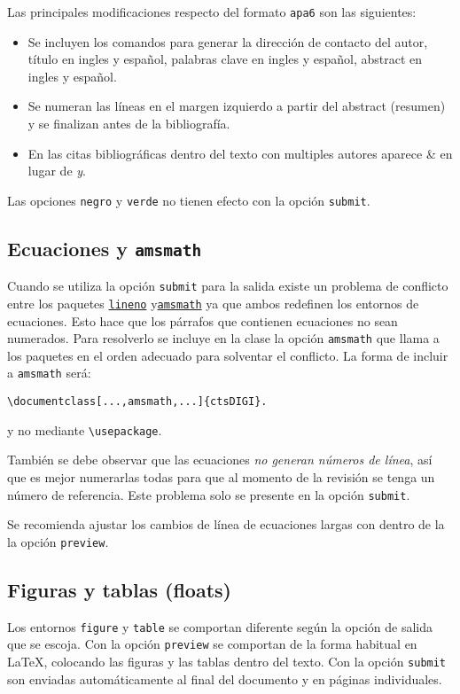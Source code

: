 \documentclass{article}
\begin{document}
Las principales modificaciones respecto del formato \texttt{apa6} son las siguientes:
\begin{itemize}
\item Se incluyen los comandos para generar la dirección de contacto del autor, título en ingles y español, palabras clave en ingles y español, abstract en ingles y español.
\item Se numeran las líneas en el margen izquierdo a partir del abstract (resumen) y se finalizan antes de la bibliografía.
\item En las citas bibliográficas dentro del texto con multiples autores aparece \& en lugar de \emph{y}.
\end{itemize}
Las opciones {\tt negro} y {\tt verde} no tienen efecto con la opción {\tt submit}.

\subsection{Ecuaciones y \texttt{amsmath}}
Cuando se utiliza la opción \texttt{submit} para la salida existe un problema de conflicto entre los paquetes \href{https://www.ctan.org/pkg/lineno}{\texttt{lineno}} y\href{https://www.ctan.org/pkg/amsmath}{\texttt{amsmath}} ya que ambos redefinen los entornos de ecuaciones. Esto hace que los párrafos que contienen ecuaciones no sean numerados. Para resolverlo se incluye en la clase la opción \texttt{amsmath} que llama a los paquetes en el orden adecuado para solventar el conflicto. La forma de incluir a \texttt{amsmath} será:
\begin{verbatim}
\documentclass[...,amsmath,...]{ctsDIGI}.
\end{verbatim}
y no mediante \texttt{\textbackslash usepackage}.

También se debe observar que las ecuaciones \emph{no generan números de línea}, así que es mejor numerarlas todas para que al momento de la revisión se tenga un número de referencia. Este problema solo se presente en la opción \texttt{submit}.

Se recomienda ajustar los cambios de línea de ecuaciones largas con dentro de la la opción \texttt{preview}.

\subsection{Figuras y tablas (floats)}
Los entornos \texttt{figure} y \texttt{table} se comportan diferente según la opción de salida que se escoja. Con la opción \texttt{preview} se comportan de la forma habitual en \LaTeX, colocando las figuras y las tablas dentro del texto. Con la opción \texttt{submit} son enviadas automáticamente al final del documento y en páginas individuales.
\end{document}

